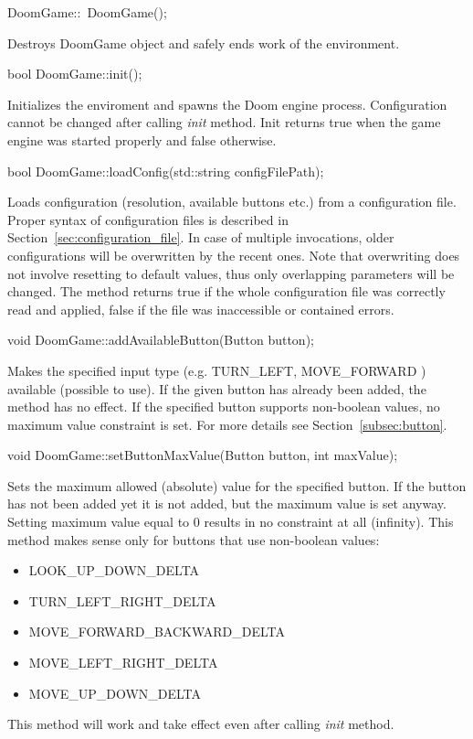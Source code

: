 \vspace{20pt}
\begin{clinee}
DoomGame::~DoomGame();
\end{clinee}
	Destroys DoomGame object and safely ends work of the environment.


\vspace{20pt}
\begin{clinee}
bool DoomGame::init();
\end{clinee}

	Initializes the enviroment and spawns the Doom engine process. Configuration cannot be changed after calling \emph{init} method. Init returns true when the game engine was started properly and false otherwise. 


\vspace{20pt}
\begin{clinee}
bool DoomGame::loadConfig(std::string configFilePath);
\end{clinee}

	Loads configuration (resolution, available buttons etc.) from a configuration file. Proper syntax of configuration files is described in Section~\ref{sec:configuration_file}. In case of multiple invocations, older configurations will be overwritten by the recent ones. Note that overwriting does not involve resetting to default values, thus only overlapping parameters will be changed. The method returns true if the whole configuration file was correctly read and applied, false if the file was inaccessible or contained errors.


\vspace{20pt}
\begin{clinee}
void DoomGame::addAvailableButton(Button button);
\end{clinee}

	Makes the specified input type (e.g. TURN\_LEFT, MOVE\_FORWARD ) available (possible to use). If the given button has already been added, the method has no effect. If the specified button supports non-boolean values, no maximum value constraint is set. For more details see Section~\ref{subsec:button}.


\vspace{20pt}
\begin{clinee}
void DoomGame::setButtonMaxValue(Button button, int maxValue);
\end{clinee}
	Sets the maximum allowed (absolute) value for the specified button. If the button has not been added yet it is not added, but the maximum value is set anyway. Setting maximum value equal to 0 results in no constraint at all (infinity). This method makes sense only for buttons that use non-boolean values:  
	\begin{itemize}
		\item LOOK\_UP\_DOWN\_DELTA
		\item TURN\_LEFT\_RIGHT\_DELTA
		\item MOVE\_FORWARD\_BACKWARD\_DELTA
		\item MOVE\_LEFT\_RIGHT\_DELTA
		\item MOVE\_UP\_DOWN\_DELTA
 	\end{itemize}
This method will work and take effect even after calling \emph{init} method.


